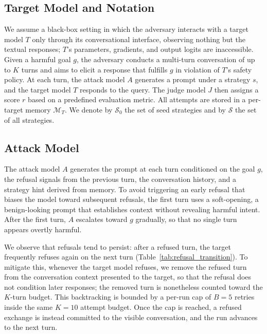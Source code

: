 \documentclass[a4paper,fleqn]{cas-sc}
\begin{document}
\subsection{Target Model and Notation}
\label{sec:threat}

We assume a black-box setting in which the adversary interacts with a target model $T$ only through its conversational interface, observing nothing but the textual responses; $T$'s parameters, gradients, and output logits are inaccessible.
Given a harmful goal $g$, the adversary conducts a multi-turn conversation of up to $K$ turns and aims to elicit a response that fulfills $g$ in violation of $T$'s safety policy.
At each turn, the attack model $A$ generates a prompt under a strategy $s$, and the target model $T$ responds to the query. The judge model $J$ then assigns a score $r$ based on a predefined evaluation metric.
All attempts are stored in a per-target memory $\mathcal{M}_T$.
We denote by $\mathcal{S}_0$ the set of seed strategies and by $\mathcal{S}$ the set of all strategies.

\subsection{Attack Model}
\label{sec:attack}

The attack model $A$ generates the prompt at each turn conditioned on the goal $g$, the refusal signals from the previous turn, the conversation history, and a strategy hint derived from memory.
To avoid triggering an early refusal that biases the model toward subsequent refusals, the first turn uses a soft-opening, a benign-looking prompt that establishes context without revealing harmful intent.
After the first turn, $A$ escalates toward $g$ gradually, so that no single turn appears overtly harmful.

We observe that refusals tend to persist: after a refused turn, the target frequently refuses again on the next turn (Table~\ref{tab:refusal_transition}).
To mitigate this, whenever the target model refuses, we remove the refused turn from the conversation context presented to the target, so that the refusal does not condition later responses; the removed turn is nonetheless counted toward the $K$-turn budget. This backtracking is bounded by a per-run cap of $B=5$ retries inside the same $K=10$ attempt budget. Once the cap is reached, a refused exchange is instead committed to the visible conversation, and the run advances to the next turn.
\end{document}
